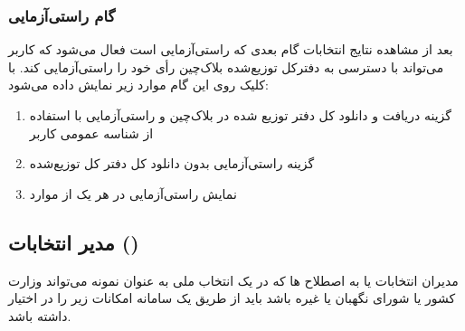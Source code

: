 \documentclass[12pt]{article}
\begin{document}
\subsubsection{گام راستی‌آزمایی}
بعد از مشاهده نتایج انتخابات گام بعدی که راستی‌آزمایی است فعال می‌شود که کاربر می‌تواند با دسترسی به دفترکل توزیع‌شده بلاک‌چین رأی خود را راستی‌آزمایی کند. با کلیک روی این گام موارد زیر نمایش داده می‌شود:
\begin{enumerate}[label=(\arabic*)]
\item
گزینه دریافت و دانلود کل دفتر توزیع شده در بلاک‌چین و راستی‌آزمایی با استفاده از شناسه عمومی کاربر
\item
گزینه راستی‌آزمایی بدون دانلود کل دفتر کل توزیع‌شده 
\item
نمایش راستی‌آزمایی در هر یک از موارد 
\end{enumerate}



\subsection{مدیر انتخابات ()}
مدیران انتخابات یا به اصطلاح 
ها
که در یک انتخاب ملی به عنوان نمونه می‌تواند وزارت کشور یا شورای نگهبان  یا غیره باشد باید از طریق یک سامانه امکانات زیر را در اختیار داشته باشد. 
\end{document}
